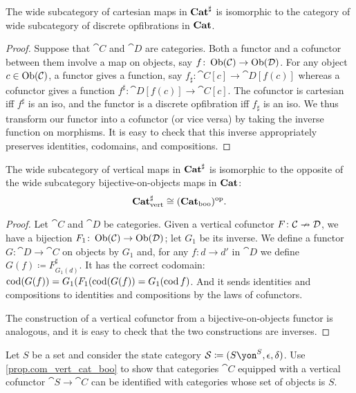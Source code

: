 \documentclass[DynamicalBook]{subfiles}
\begin{document}
\begin{proposition}
The wide subcategory of cartesian maps in $\textbf{Cat}^\sharp$ is isomorphic to the category of wide subcategory of discrete opfibrations in $\textbf{Cat}$.
\end{proposition}
\begin{proof}
Suppose that $\cat{C}$ and $\cat{D}$ are categories. Both a functor and a cofunctor between them involve a map on objects, say $f\colon\operatorname{Ob}(\mathcal{C})\to\operatorname{Ob}(\mathcal{D})$. For any object $c\in\operatorname{Ob}(\mathcal{C})$, a functor gives a function, say $f_\sharp\colon\cat{C}[c]\to\cat{D}[f(c)]$ whereas a cofunctor gives a function $f^\sharp\colon\cat{D}[f(c)]\to\cat{C}[c]$. The cofunctor is cartesian iff $f^\sharp$ is an iso, and the functor is a discrete opfibration iff $f_\sharp$ is an iso. We thus transform our functor into a cofunctor (or vice versa) by taking the inverse function on morphisms. It is easy to check that this inverse appropriately preserves identities, codomains, and compositions.
\end{proof}

\begin{proposition}\label{prop.com_vert_cat_boo}
The wide subcategory of vertical maps in $\textbf{Cat}^\sharp$ is isomorphic to the opposite of the wide subcategory bijective-on-objects maps in $\textbf{Cat}$:
\[
\textbf{Cat}^\sharp_{\text{vert}}\cong(\textbf{Cat}_{\text{boo}})^{\textnormal{op}}.
\]
\end{proposition}
\begin{proof}
Let $\cat{C}$ and $\cat{D}$ be categories. Given a vertical cofunctor $F\colon\mathcal{C}\nrightarrow\mathcal{D}$, we have a bijection $F_1\colon\operatorname{Ob}(\mathcal{C})\to\operatorname{Ob}(\mathcal{D})$; let $G_1$ be its inverse. We define a functor $G\colon\cat{D}\to\cat{C}$ on objects by $G_1$ and, for any $f\colon d\to d'$ in $\cat{D}$ we define $G(f)\coloneqq F^\sharp_{G_1(d)}$. It has the correct codomain: $\operatorname{cod}(G(f))=G_1(F_1(\operatorname{cod}(G(f))=G_1(\operatorname{cod} f)$. And it sends identities and compositions to identities and compositions by the laws of cofunctors.

The construction of a vertical cofunctor from a bijective-on-objects functor is analogous, and it is easy to check that the two constructions are inverses.
\end{proof}

\begin{exercise}
Let $S$ be a set and consider the state category $\cat{S}\coloneqq(S\yon^S,\epsilon,\delta)$. Use \cref{prop.com_vert_cat_boo} to show that categories $\cat{C}$ equipped with a vertical cofunctor $\cat{S}\to\cat{C}$ can be identified with categories whose set of objects is $S$.
\end{exercise}
\end{document}
